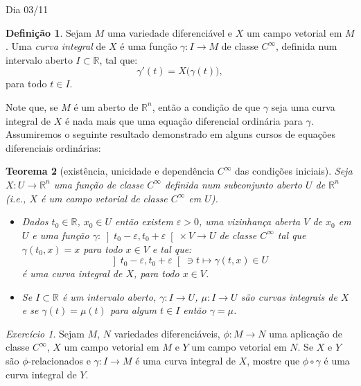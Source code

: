 \documentclass[oneside,11pt]{amsart}
\newcommand{\R}{\mathds R}
\theoremstyle{remark}\newtheorem{exercise}{Exercício}[section]
\theoremstyle{plain}\newtheorem{teo}{Teorema}[section]
\theoremstyle{plain}\newtheorem{lem}[teo]{Lema}
\theoremstyle{plain}\newtheorem{prop}[teo]{Proposição}
\theoremstyle{definition}\newtheorem{defin}[teo]{Definição}
\theoremstyle{remark}\newtheorem{rem}[teo]{Observação}
\theoremstyle{definition}\newtheorem{example}[teo]{Exemplo}
\numberwithin{equation}{section}
\begin{document}
\begin{section}{Dia 03/11}

\begin{defin}
Sejam $M$ uma variedade diferenciável e $X$ um campo vetorial em $M$. Uma {\em curva integral\/} de $X$ é uma função
$\gamma:I\to M$ de classe $C^\infty$, definida num intervalo aberto $I\subset\R$, tal que:
\[\gamma'(t)=X\big(\gamma(t)\big),\]
para todo $t\in I$.
\end{defin}

Note que, se $M$ é um aberto de $\R^n$, então a condição de que $\gamma$ seja uma curva integral de $X$ é nada mais que uma equação
diferencial ordinária para $\gamma$. Assumiremos o seguinte resultado demonstrado em alguns
cursos de equações diferenciais ordinárias:
\begin{teo}[existência, unicidade e dependência $C^\infty$ das condições iniciais]\label{thm:EDO}
Seja $X:U\to\R^n$ uma função de classe $C^\infty$ definida num subconjunto aberto $U$ de $\R^n$ (i.e., $X$ é um campo
vetorial de classe $C^\infty$ em $U$).
\begin{itemize}
\item[(a)] Dados $t_0\in\R$, $x_0\in U$ então
existem $\varepsilon>0$, uma vizinhança aberta $V$ de $x_0$ em $U$ e uma função
$\gamma:\left]t_0-\varepsilon,t_0+\varepsilon\right[\times V\to U$ de classe $C^\infty$ tal que $\gamma(t_0,x)=x$ para todo $x\in V$ e tal que:
\[\left]t_0-\varepsilon,t_0+\varepsilon\right[\ni t\longmapsto\gamma(t,x)\in U\]
é uma curva integral de $X$, para todo $x\in V$.
\item[(b)] Se $I\subset\R$ é um intervalo aberto, $\gamma:I\to U$, $\mu:I\to U$
são curvas integrais de $X$ e se $\gamma(t)=\mu(t)$ para algum $t\in I$ então $\gamma=\mu$.
\end{itemize}
\end{teo}

\begin{exercise}\label{exe:curintphirel}
Sejam $M$, $N$ variedades diferenciáveis, $\phi:M\to N$ uma aplicação de classe $C^\infty$, $X$ um campo vetorial em $M$
e $Y$ um campo vetorial em $N$. Se $X$ e $Y$ são $\phi$-relacionados e $\gamma:I\to M$ é uma curva integral de $X$, mostre
que $\phi\circ\gamma$ é uma curva integral de $Y$.
\end{exercise}


\end{section}
\end{document}
